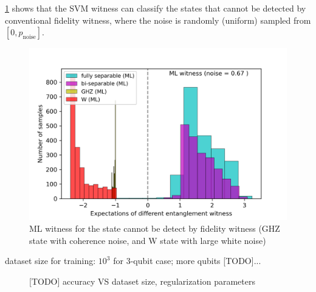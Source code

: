 \documentclass[
aps,
pra,
twocolumn,
floatfix,
]{revtex4-2}
\theoremstyle{plain}
\theoremstyle{definition}
\newcommand{\noise}{\text{noise}}
\begin{document}

\cref{fig:ml_compare} shows that the SVM witness can classify the states that cannot be detected by conventional fidelity witness,
where the noise is randomly (uniform) sampled from $[0,p_{\noise}]$.

\begin{figure}[!ht]
	\centering
		\includegraphics[width=.9\linewidth]{./Code/three_qubit_hist_ML.png}
	\caption{ML witness for the state cannot be detect by fidelity witness (GHZ state with coherence noise, and W state with large white noise)}
	\label{fig:ml_compare}
\end{figure}

dataset size for training: $10^3$ for 3-qubit case; more qubits [TODO]...
\begin{figure}[!ht]
	\centering
	\caption{[TODO] accuracy VS dataset size, regularization parameters}
\end{figure}
\end{document}
